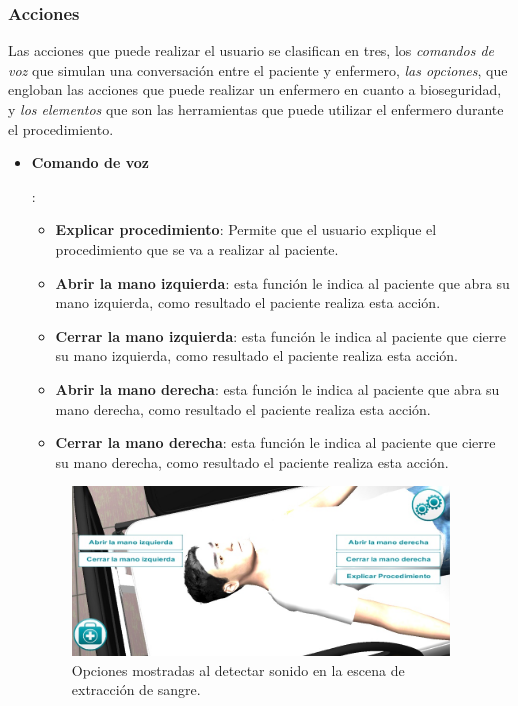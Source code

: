 \subsubsection{Acciones}

Las acciones que puede realizar el usuario se clasifican en tres, los
\emph{comandos de voz} que simulan una conversación entre el paciente y
enfermero, \emph{las opciones}, que engloban las acciones que puede realizar un
enfermero en cuanto a bioseguridad, y \emph{los elementos} que son las
herramientas que puede utilizar el enfermero durante el procedimiento.

\begin{itemize}
\item{\textbf{Comando de voz}}

:

\begin{itemize}
    \item \textbf{Explicar procedimiento}: Permite que el usuario explique el
        procedimiento que se va a realizar al paciente. 
\item \textbf{Abrir la mano izquierda}: esta función le indica al paciente que
    abra su mano izquierda, como resultado el paciente realiza esta acción.
\item \textbf{Cerrar la mano izquierda}: esta función le indica al paciente que
    cierre su mano izquierda, como resultado el paciente realiza esta acción.
\item \textbf{Abrir la mano derecha}: esta función le indica al paciente que
    abra su mano derecha, como resultado el paciente realiza esta acción.
\item \textbf{Cerrar la mano derecha}: esta función le indica al paciente que
    cierre su mano derecha, como resultado el paciente realiza esta acción.
\end{itemize}

\begin{figure}[H]
\centering
\includegraphics[width=10cm]{solucion/images/hemocultivo_comando_voz.jpg}
\caption{Opciones mostradas al detectar sonido en la escena de extracción
    de sangre.}
\label{fig:hemocultivo_voz_gui}
\end{figure}


\end{itemize}

